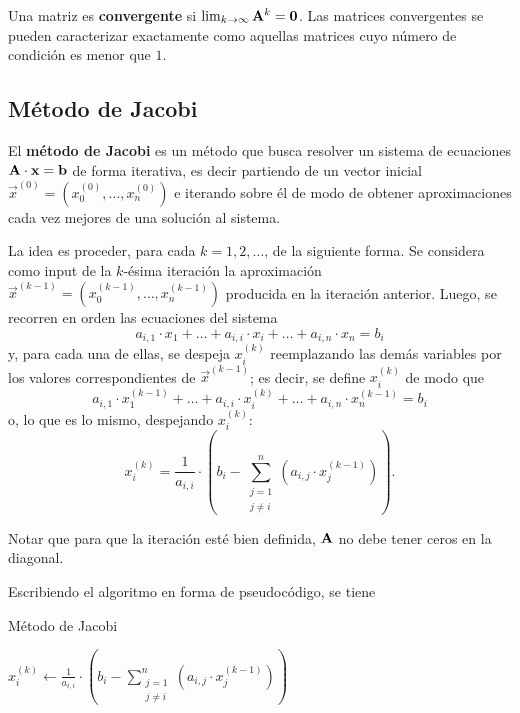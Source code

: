 Una matriz es \textbf{convergente} si $\lim_{k \to \infty} \mathbf{A}^k
= \mathbf{0}$. Las matrices convergentes se pueden caracterizar exactamente como
aquellas matrices cuyo número de condición es menor que $1$.


\subsection{Método de Jacobi}
El \textbf{método de Jacobi} es un método que busca resolver un sistema de
ecuaciones $\mathbf{A} \cdot \mathbf{x} = \mathbf{b}$ de forma iterativa, es decir
partiendo de un vector inicial $\vec{x}^{(0)} = (x^{(0)}_0, \dots, x^{(0)}_n)$
e iterando sobre él de modo de obtener aproximaciones cada vez mejores de una
solución al sistema.

La idea es proceder, para cada $k = 1, 2, \dots$, de la siguiente forma.
Se considera como input de la $k$-ésima iteración la aproximación
$\vec{x}^{(k-1)} = (x^{(k-1)}_0, \dots, x^{(k-1)}_n)$ producida en la
iteración anterior. Luego, se recorren en orden las ecuaciones del sistema
\[ a_{i,1} \cdot x_1 + \dots + a_{i,i} \cdot x_i + \dots
    + a_{i,n} \cdot x_n = b_i \]
y, para cada una de ellas, se despeja $x^{(k)}_i$ reemplazando las demás
variables por los valores correspondientes de $\vec{x}^{(k-1)}$; es decir,
se define $x^{(k)}_i$ de modo que
\[ a_{i,1} \cdot x^{(k-1)}_1 + \dots + a_{i,i} \cdot x^{(k)}_i + \dots
    + a_{i,n} \cdot x^{(k-1)}_n = b_i \]
o, lo que es lo mismo, despejando $x^{(k)}_i$:
\[ x^{(k)}_i = \frac{1}{a_{i,i}} \cdot \left( b_i -
    \sum_{\substack{j=1 \\ j \neq i}}^{n} \left( a_{i,j}
    \cdot x^{(k-1)}_j \right) \right). \]

Notar que para que la iteración esté bien definida, $\mathbf{A}$ no debe tener
ceros en la diagonal.

Escribiendo el algoritmo en forma de pseudocódigo, se tiene

\begin{algorithm}[H]
\caption{Método de Jacobi}
\label{algo:jacobi}


 {
     {
        $\displaystyle x^{(k)}_i \gets \frac{1}{a_{i,i}} \cdot \left( b_i -
            \sum_{\substack{j=1 \\ j \neq i}}^{n} \left( a_{i,j}
            \cdot x^{(k-1)}_j \right) \right)$\;
    }
}
\end{algorithm}

